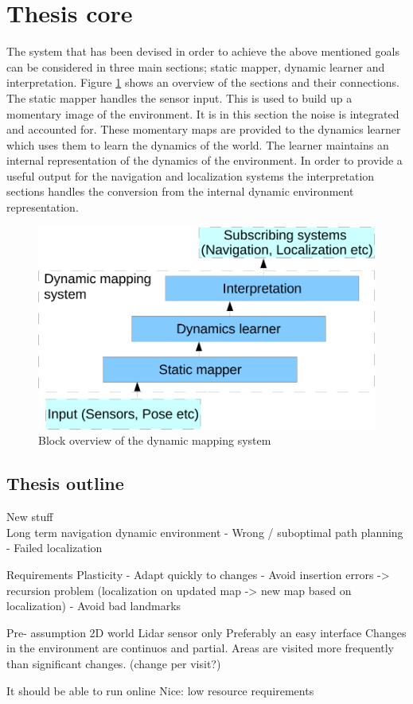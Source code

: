 \section{Thesis core}
The system that has been devised in order to achieve the above mentioned goals can be considered in three main sections; static mapper, dynamic learner and interpretation. 
Figure \ref{fig:block-overview} shows an overview of the sections and their connections. 
The static mapper handles the sensor input. This is used to build up a momentary image of the environment. It is in this section the noise is integrated and accounted for. 
These momentary maps are provided to the dynamics learner which uses them to learn the dynamics of the world. 
The learner maintains an internal representation of the dynamics of the environment. 
In order to provide a useful output for the navigation and localization systems the interpretation sections handles the conversion from the internal dynamic environment representation. 

\begin{figure} [htbp]
	\centering
	\includegraphics[scale=0.7]{chapters/introduction/figures/system-overview}
	\caption{Block overview of the dynamic mapping system}
	\label{fig:block-overview}
\end{figure}

\subsection{Thesis outline}

New stuff\\
Long term navigation dynamic environment
- Wrong / suboptimal path planning
- Failed localization

Requirements
Plasticity
- Adapt quickly to changes 
- Avoid insertion errors -> recursion problem (localization on updated map -> new map based on localization)
- Avoid bad landmarks

Pre- assumption
2D world
Lidar sensor only
Preferably an easy interface 
Changes in the environment are continuos and partial. Areas are visited more frequently than significant changes. (change per visit?)

It should be able to run online
Nice: low resource requirements




